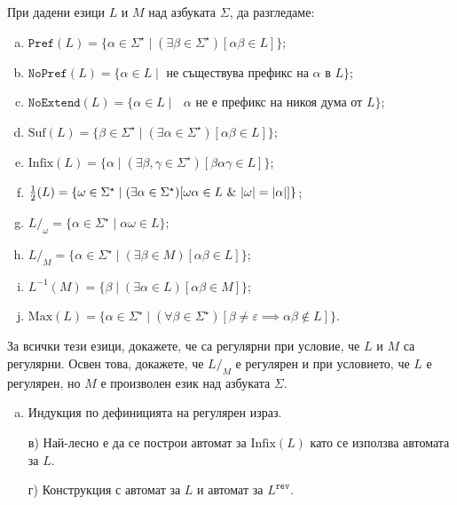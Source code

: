 \begin{problem}
  При дадени езици $L$ и $M$ над азбуката $\Sigma$, да разгледаме:
  \begin{enumerate}[a)]
  \item
    $\texttt{Pref}(L) = \{\alpha \in \Sigma^\star \mid (\exists \beta \in \Sigma^\star)[\alpha\beta \in L]\}$;
  \item
    $\texttt{NoPref}(L) = \{\alpha \in L \mid \text{ не съществува префикс на $\alpha$ в $L$}\}$;
  \item
    $\texttt{NoExtend}(L) = \{\alpha \in L \mid \text{ $\alpha$ не е префикс на никоя дума от $L$}\}$;
  \item
    $\mbox{Suf}(L) = \{\beta \in \Sigma^\star \mid (\exists \alpha \in \Sigma^\star)[\alpha\beta \in L]\}$;
  \item
    $\text{Infix}(L) = \{\alpha \mid (\exists \beta,\gamma \in \Sigma^\star)[\beta\alpha\gamma \in L]\}$;
  \item 
    $\frac{1}{2}(L) = \{\omega \in \Sigma^\star \mid (\exists \alpha \in \Sigma^\star)[\omega\alpha \in L\ \&\ \abs{\omega} = \abs{\alpha}]\}$;
  \item
    $L/_\omega = \{\alpha \in \Sigma^\star \mid \alpha\omega \in L\}$;
  \item
    $L/_{M} = \{\alpha \in \Sigma^\star \mid (\exists \beta \in M)[\alpha\beta \in L ] \}$;
  \item
    $L^{-1}(M) = \{ \beta \mid (\exists \alpha \in L)[ \alpha\beta \in M]\}$;
  \item
    $\mbox{Max}(L) = \{\alpha \in \Sigma^\star \mid (\forall \beta\in\Sigma^\star)[\beta \neq \varepsilon\implies \alpha\beta \not\in L]\}$.
  \end{enumerate}
  За всички тези езици, докажете, че са регулярни при условие, че $L$ и $M$ са регулярни.
  Освен това, докажете, че $L/_{M}$ е регулярен и при условието, че $L$ е регулярен, но $M$ е произволен език над азбуката $\Sigma$.
\end{problem}
\begin{hint}
  \begin{enumerate}[a)]
  \item 
    Индукция по дефиницията на регулярен израз.
  \item[в)]
    Най-лесно е да се построи автомат за $\text{Infix}(L)$ като се използва автомата за $L$.
  \item[г)]
    Конструкция с автомат за $L$ и автомат за $L^{\texttt{rev}}$.
  \end{enumerate}
\end{hint}

